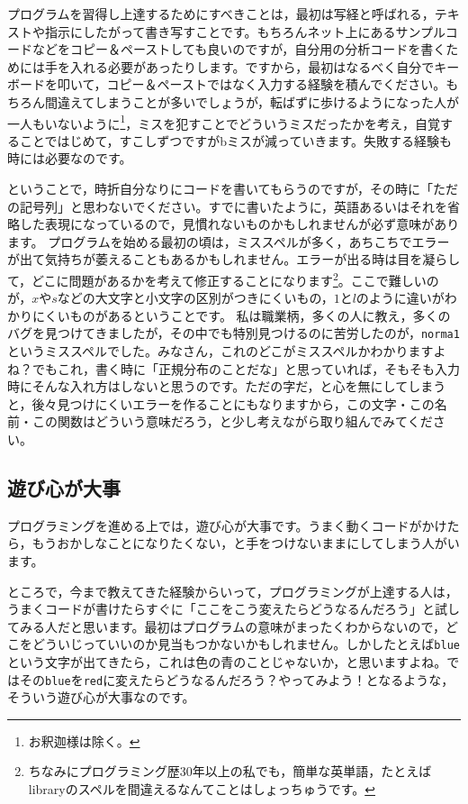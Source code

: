 \documentclass{ltjsbook}
\begin{document}
プログラムを習得し上達するためにすべきことは，最初は写経と呼ばれる，テキストや指示にしたがって書き写すことです。もちろんネット上にあるサンプルコードなどをコピー＆ペーストしても良いのですが，自分用の分析コードを書くためには手を入れる必要があったりします。ですから，最初はなるべく自分でキーボードを叩いて，コピー＆ペーストではなく入力する経験を積んでください。もちろん間違えてしまうことが多いでしょうが，転ばずに歩けるようになった人が一人もいないように\footnote{お釈迦様は除く。}，ミスを犯すことでどういうミスだったかを考え，自覚することではじめて，すこしずつですがbミスが減っていきます。失敗する経験も時には必要なのです。

ということで，時折自分なりにコードを書いてもらうのですが，その時に「ただの記号列」と思わないでください。すでに書いたように，英語あるいはそれを省略した表現になっているので，見慣れないものかもしれませんが必ず意味があります。
プログラムを始める最初の頃は，ミススペルが多く，あちこちでエラーが出て気持ちが萎えることもあるかもしれません。エラーが出る時は目を凝らして，どこに問題があるかを考えて修正することになります\footnote{ちなみにプログラミング歴30年以上の私でも，簡単な英単語，たとえばlibraryのスペルを間違えるなんてことはしょっちゅうです。}。ここで難しいのが，$x$や$s$などの大文字と小文字の区別がつきにくいもの，$1$と$l$のように違いがわかりにくいものがあるということです。
私は職業柄，多くの人に教え，多くのバグを見つけてきましたが，その中でも特別見つけるのに苦労したのが，\texttt{norma1}というミススペルでした。みなさん，これのどこがミススペルかわかりますよね？でもこれ，書く時に「正規分布のことだな」と思っていれば，そもそも入力時にそんな入れ方はしないと思うのです。ただの字だ，と心を無にしてしまうと，後々見つけにくいエラーを作ることにもなりますから，この文字・この名前・この関数はどういう意味だろう，と少し考えながら取り組んでみてください。

\subsection{遊び心が大事}
プログラミングを進める上では，遊び心が大事です。うまく動くコードがかけたら，もうおかしなことになりたくない，と手をつけないままにしてしまう人がいます。

ところで，今まで教えてきた経験からいって，プログラミングが上達する人は，うまくコードが書けたらすぐに「ここをこう変えたらどうなるんだろう」と試してみる人だと思います。最初はプログラムの意味がまったくわからないので，どこをどういじっていいのか見当もつかないかもしれません。しかしたとえば\texttt{blue}という文字が出てきたら，これは色の青のことじゃないか，と思いますよね。ではその\texttt{blue}を\texttt{red}に変えたらどうなるんだろう？やってみよう！となるような，そういう遊び心が大事なのです。
\end{document}
